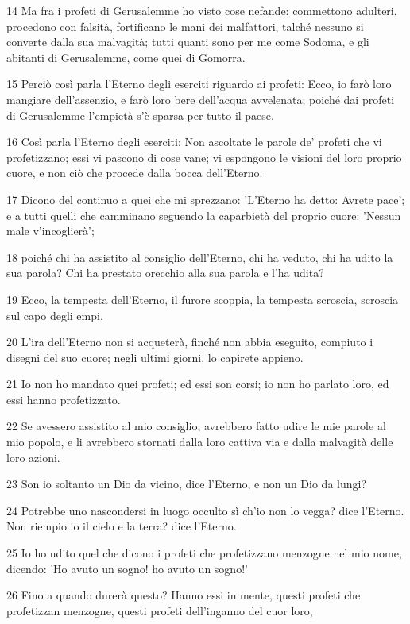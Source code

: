 \par 14 Ma fra i profeti di Gerusalemme ho visto cose nefande: commettono adulteri, procedono con falsità, fortificano le mani dei malfattori, talché nessuno si converte dalla sua malvagità; tutti quanti sono per me come Sodoma, e gli abitanti di Gerusalemme, come quei di Gomorra.
\par 15 Perciò così parla l'Eterno degli eserciti riguardo ai profeti: Ecco, io farò loro mangiare dell'assenzio, e farò loro bere dell'acqua avvelenata; poiché dai profeti di Gerusalemme l'empietà s'è sparsa per tutto il paese.
\par 16 Così parla l'Eterno degli eserciti: Non ascoltate le parole de' profeti che vi profetizzano; essi vi pascono di cose vane; vi espongono le visioni del loro proprio cuore, e non ciò che procede dalla bocca dell'Eterno.
\par 17 Dicono del continuo a quei che mi sprezzano: 'L'Eterno ha detto: Avrete pace'; e a tutti quelli che camminano seguendo la caparbietà del proprio cuore: 'Nessun male v'incoglierà';
\par 18 poiché chi ha assistito al consiglio dell'Eterno, chi ha veduto, chi ha udito la sua parola? Chi ha prestato orecchio alla sua parola e l'ha udita?
\par 19 Ecco, la tempesta dell'Eterno, il furore scoppia, la tempesta scroscia, scroscia sul capo degli empi.
\par 20 L'ira dell'Eterno non si acqueterà, finché non abbia eseguito, compiuto i disegni del suo cuore; negli ultimi giorni, lo capirete appieno.
\par 21 Io non ho mandato quei profeti; ed essi son corsi; io non ho parlato loro, ed essi hanno profetizzato.
\par 22 Se avessero assistito al mio consiglio, avrebbero fatto udire le mie parole al mio popolo, e li avrebbero stornati dalla loro cattiva via e dalla malvagità delle loro azioni.
\par 23 Son io soltanto un Dio da vicino, dice l'Eterno, e non un Dio da lungi?
\par 24 Potrebbe uno nascondersi in luogo occulto sì ch'io non lo vegga? dice l'Eterno. Non riempio io il cielo e la terra? dice l'Eterno.
\par 25 Io ho udito quel che dicono i profeti che profetizzano menzogne nel mio nome, dicendo: 'Ho avuto un sogno! ho avuto un sogno!'
\par 26 Fino a quando durerà questo? Hanno essi in mente, questi profeti che profetizzan menzogne, questi profeti dell'inganno del cuor loro,
